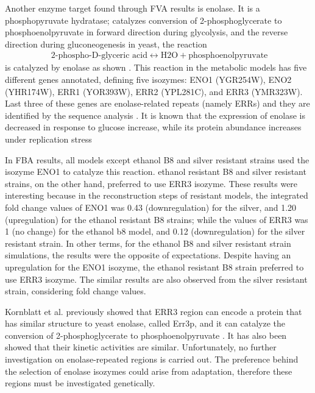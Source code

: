 Another enzyme target found through FVA results is enolase. It is a phosphopyruvate hydratase; catalyzes conversion of 2-phosphoglycerate to phosphoenolpyruvate in forward direction during glycolysis, and the reverse direction during gluconeogenesis in yeast, the reaction
\begin{align}
  \label{eq:enolase}
  \ \text{2-phospho-D-glyceric acid} \leftrightarrow \text{H2O} + \text{phosphoenolpyruvate}
\end{align}
is catalyzed by enolase as shown \cite{tkach2012dissecting}. This reaction in the metabolic models has five different genes annotated, defining five isozymes: ENO1 (YGR254W), ENO2 (YHR174W), ERR1 (YOR393W), ERR2 (YPL281C), and ERR3 (YMR323W). Last three of these genes are enolase-related repeats (namely ERRs) and they are identified by the sequence analysis \cite{pryde1995sequence}. It is known that the expression of enolase is decreased in response to glucose increase, while its protein abundance increases under replication stress

In FBA results, all models except ethanol B8 and silver resistant strains used the isozyme ENO1 to catalyze this reaction. ethanol resistant B8 and silver resistant strains, on the other hand, preferred to use ERR3 isozyme. These results were interesting because in the reconstruction steps of resistant models, the integrated fold change values of ENO1 was 0.43 (downregulation) for the silver, and 1.20 (upregulation) for the ethanol resistant B8 strains; while the values of ERR3 was 1 (no change) for the ethanol b8 model, and 0.12 (downregulation) for the silver resistant strain. In other terms, for the ethanol B8 and silver resistant strain simulations, the results were the opposite of expectations. Despite having an upregulation for the ENO1 isozyme, the ethanol resistant B8 strain preferred to use ERR3 isozyme. The similar results are also observed from the silver resistant strain, considering fold change values.

Kornblatt et al. previously showed that ERR3 region can encode a protein that has similar structure to yeast enolase, called Err3p, and it can catalyze the conversion of 2-phosphoglycerate to phosphoenolpyruvate \cite{kornblatt2013saccharomyces}. It has also been showed that their kinetic activities are similar. Unfortunately, no further investigation on enolase-repeated regions is carried out. The preference behind the selection of enolase isozymes could arise from adaptation, therefore these regions must be investigated genetically.

